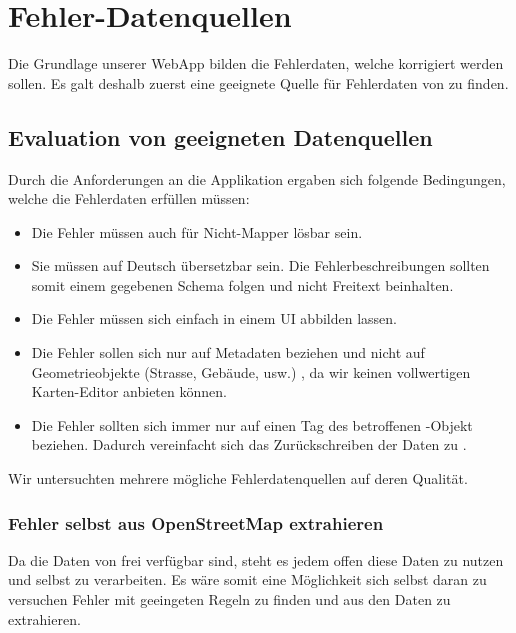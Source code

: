 \chapter{Fehler-Datenquellen}
\label{datenquellen}
Die Grundlage unserer \gls{WebApp} bilden die Fehlerdaten, welche korrigiert werden sollen.
Es galt deshalb zuerst eine geeignete Quelle für Fehlerdaten von  zu finden.

\section{Evaluation von geeigneten Datenquellen}
Durch die Anforderungen an die Applikation ergaben sich folgende Bedingungen, welche die Fehlerdaten erfüllen müssen:

\begin{itemize}
\item Die Fehler müssen auch für Nicht-\gls{Mapper} lösbar sein.
\item Sie müssen auf Deutsch übersetzbar sein. Die Fehlerbeschreibungen sollten somit einem gegebenen Schema folgen und nicht Freitext beinhalten.
\item Die Fehler müssen sich einfach in einem UI abbilden lassen.
\item Die Fehler sollen sich nur auf Metadaten beziehen und nicht auf Geometrieobjekte (Strasse, Gebäude, usw.) , da wir keinen vollwertigen Karten-Editor anbieten können.
\item Die Fehler sollten sich immer nur auf einen \gls{Tag} des betroffenen -Objekt beziehen. Dadurch vereinfacht sich das Zurückschreiben der Daten zu .
\end{itemize}

Wir untersuchten mehrere mögliche Fehlerdatenquellen auf deren Qualität.

\subsection{Fehler selbst aus OpenStreetMap extrahieren}
Da die Daten von  frei verfügbar sind, steht es jedem offen diese Daten zu nutzen und selbst zu verarbeiten.
Es wäre somit eine Möglichkeit sich selbst daran zu versuchen Fehler mit geeingeten Regeln zu finden und aus den Daten zu extrahieren.

